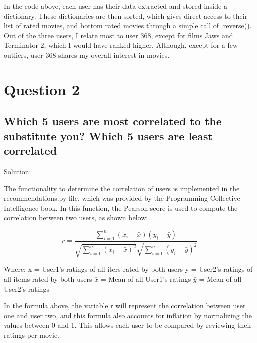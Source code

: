 \documentclass[11pt]{scrartcl} %
\begin{document}
\tabto{2.0cm} In the code above, each user has their data extracted and stored inside a dictionary. These dictionaries are then sorted, which gives direct access to their list of rated movies, and bottom rated movies through a simple call of .reverse().
\newline \newline
\tabto{2.0cm} Out of the three users, I relate most to user 368, except for films Jaws and Terminator 2, which I would have ranked higher. Although, except for a few outliers, user 368 shares my overall interest in movies.

\pagebreak

\section*{Question 2}


\subsection*{Which 5 users are most correlated to the substitute you? Which
5 users are least correlated}

\bigskip\bigskip
\LARGE Solution: \newline\newline\small

\tabto{2.0cm} The functionality to determine the correlation of users is implemented in the recommendations.py file, which was provided by the Programming Collective Intelligence book. In this function, the Pearson score is used to compute the correlation between two users, as shown below:

$$ r = \frac{\sum^n_{i=1}(x_i - \bar x)(y_i - \bar y)}{\sqrt {\sum^n_{i=1}(x_i - \bar x)^2}{\sqrt{\sum^n_{i=1}(y_i - \bar y)^2}}} $$

Where: \newline
x = User1's ratings of all iters rated by both users \newline
y = User2's ratings of all items rated by both users \newline
$\bar x$ = Mean of all User1's ratings \newline
$\bar y$ = Mean of all User2's ratings \newline

\tabto{2.0 cm} In the formula above, the variable r will represent the correlation between user one and user two, and this formula also accounts for inflation by normalizing the values between 0 and 1. This allows each user to be compared by reviewing their ratings per movie.
\end{document}

